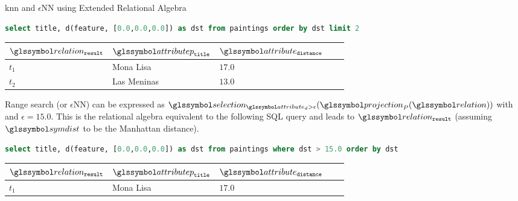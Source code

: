 \begin{example}[label=example:proximity_based_queries]{\acrshort{knn} and $\epsilon$NN using Extended Relational Algebra}{}
    \begin{lstlisting}[language=SQL, showspaces=false, basicstyle=\ttfamily, numbers=none]
        select title, d(feature, [0.0,0.0,0.0]) as dst from paintings order by dst limit 2
    \end{lstlisting}

    \begin{center}
        \begin{tabular}{ l || l | l | l | l |}
            $\relation_{\mathtt{result}}$ & $\attributep_{\mathtt{title}}$  & $\attribute_{\mathtt{distance}}$ \\ 
            \hline
            \hline
            $t_1$ & Mona Lisa &  $17.0$ \\
            \hline
            $t_2$ & Las Meninas & $13.0$ \\
            \hline
        \end{tabular}
    \end{center}

    Range search (or $\epsilon$NN) can be expressed as $\selection_{\attribute_d > \epsilon}(\projection_{P} (\relation))$ with and $\epsilon = 15.0$. This is the relational algebra equivalent to the following SQL query and leads to $\relation_{\mathtt{result}}$ (assuming $ \symdist$ to be the Manhattan distance).

    \begin{lstlisting}[language=SQL, showspaces=false, basicstyle=\ttfamily, numbers=none]
        select title, d(feature, [0.0,0.0,0.0]) as dst from paintings where dst > 15.0 order by dst
    \end{lstlisting}

    \begin{center}
        \begin{tabular}{ l || l | l | l | l |}
            $\relation_{\mathtt{result}}$ & $\attributep_{\mathtt{title}}$  & $\attribute_{\mathtt{distance}}$ \\ 
            \hline
            \hline
            $t_1$ & Mona Lisa &  $17.0$ \\
            \hline
        \end{tabular}
    \end{center}
\end{example}

